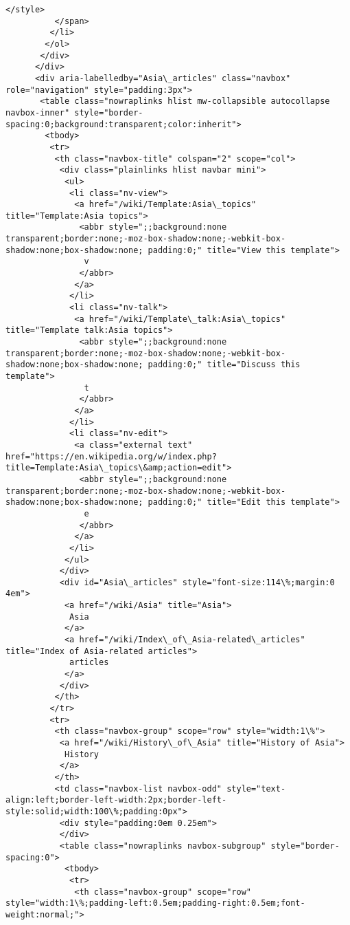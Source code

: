 \documentclass[11pt]{article}
\begin{document}
\begin{Verbatim}[commandchars=\\\{\}]
           </style>
          </span>
         </li>
        </ol>
       </div>
      </div>
      <div aria-labelledby="Asia\_articles" class="navbox" role="navigation" style="padding:3px">
       <table class="nowraplinks hlist mw-collapsible autocollapse navbox-inner" style="border-spacing:0;background:transparent;color:inherit">
        <tbody>
         <tr>
          <th class="navbox-title" colspan="2" scope="col">
           <div class="plainlinks hlist navbar mini">
            <ul>
             <li class="nv-view">
              <a href="/wiki/Template:Asia\_topics" title="Template:Asia topics">
               <abbr style=";;background:none transparent;border:none;-moz-box-shadow:none;-webkit-box-shadow:none;box-shadow:none; padding:0;" title="View this template">
                v
               </abbr>
              </a>
             </li>
             <li class="nv-talk">
              <a href="/wiki/Template\_talk:Asia\_topics" title="Template talk:Asia topics">
               <abbr style=";;background:none transparent;border:none;-moz-box-shadow:none;-webkit-box-shadow:none;box-shadow:none; padding:0;" title="Discuss this template">
                t
               </abbr>
              </a>
             </li>
             <li class="nv-edit">
              <a class="external text" href="https://en.wikipedia.org/w/index.php?title=Template:Asia\_topics\&amp;action=edit">
               <abbr style=";;background:none transparent;border:none;-moz-box-shadow:none;-webkit-box-shadow:none;box-shadow:none; padding:0;" title="Edit this template">
                e
               </abbr>
              </a>
             </li>
            </ul>
           </div>
           <div id="Asia\_articles" style="font-size:114\%;margin:0 4em">
            <a href="/wiki/Asia" title="Asia">
             Asia
            </a>
            <a href="/wiki/Index\_of\_Asia-related\_articles" title="Index of Asia-related articles">
             articles
            </a>
           </div>
          </th>
         </tr>
         <tr>
          <th class="navbox-group" scope="row" style="width:1\%">
           <a href="/wiki/History\_of\_Asia" title="History of Asia">
            History
           </a>
          </th>
          <td class="navbox-list navbox-odd" style="text-align:left;border-left-width:2px;border-left-style:solid;width:100\%;padding:0px">
           <div style="padding:0em 0.25em">
           </div>
           <table class="nowraplinks navbox-subgroup" style="border-spacing:0">
            <tbody>
             <tr>
              <th class="navbox-group" scope="row" style="width:1\%;padding-left:0.5em;padding-right:0.5em;font-weight:normal;">

\end{Verbatim}
\end{document}
